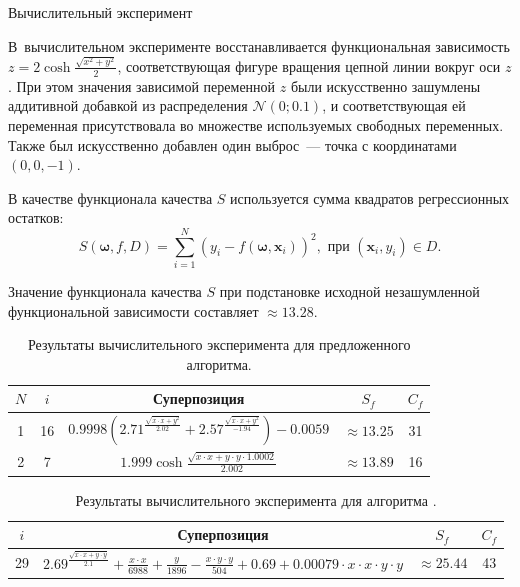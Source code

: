 \documentclass[12pt,a4paper]{article}
\makeatletter
\renewcommand{\section}{\@startsection {section}{1}
  \z@{2.7ex \@plus 1ex}{1.0ex}%
  {\normalfont}}
\makeatother
\begin{document}

\section{Вычислительный эксперимент}

В~вычислительном эксперименте восстанавливается функциональная зависимость
$z = 2 \cosh \frac{\sqrt{x^2 + y^2}}{2}$, соответствующая фигуре вращения
цепной линии вокруг оси $z$. При этом значения зависимой
переменной $z$ были искусственно зашумлены аддитивной добавкой из
распределения $\mathcal{N} (0; 0.1)$, и соответствующая ей переменная
присутствовала во множестве используемых свободных переменных.
Также был искусственно добавлен один
выброс~--- точка с координатами $(0, 0, -1)$.

В качестве функционала качества $S$ используется сумма квадратов
регрессионных остатков:
\begin{equation}
  \label{eq:sse_expr}
  S(\boldsymbol{\omega}, f, D) = \sum_{i=1}^N (y_i - f (\boldsymbol{\omega}, \mathbf{x}_i))^2, \text{\ при\ } (\mathbf{x}_i, y_i) \in D.
\end{equation}

Значение функционала качества $S$ при подстановке исходной незашумленной
функциональной зависимости составляет $\approx 13.28$.

\begin{table}[h]
  \centering
  \begin{tabular}{| c | c | c | c | c |} \hline
	$N$ & $i$	& Суперпозиция																															& $S_f$				& $C_f$ \\ \hline
	1	& 16	& $0.9998 \left(2.71^{\frac{\sqrt{x \cdot x + y^2}}{2.02}} + 2.57^{\frac{\sqrt{x \cdot x + y ^2}}{-1.94}}\right) - 0.0059$				& $\approx 13.25$	& 31	\\ \hline
	2	& 7		& $1.999 \cosh \frac{\sqrt{x \cdot x + y \cdot y \cdot 1.0002}}{2.002}$																	& $\approx 13.89$	& 16	\\ \hline
  \end{tabular}
  \caption{Результаты вычислительного эксперимента для предложенного алгоритма.}
  \label{tabl:results}
\end{table}

\begin{table}[h]
  \centering
  \begin{tabular}{| c | c | c | c |} \hline
	$i$ & Суперпозиция																					& $S_f$				& $C_f$ \\ \hline
	29  & $2.69^{\frac{\sqrt{x \cdot x + y \cdot y}}{2.1}} + \frac{x \cdot x}{6988} + \frac{y}{1896} - \frac{x \cdot y \cdot y}{504} + 0.69 + 0.00079 \cdot x \cdot x \cdot y \cdot y$				& $\approx 25.44$	& 43	\\ \hline
  \end{tabular}
  \caption{Результаты вычислительного эксперимента для алгоритма \cite{Zelinka2008}.}
  \label{tabl:results_Z}
\end{table}
\end{document}
